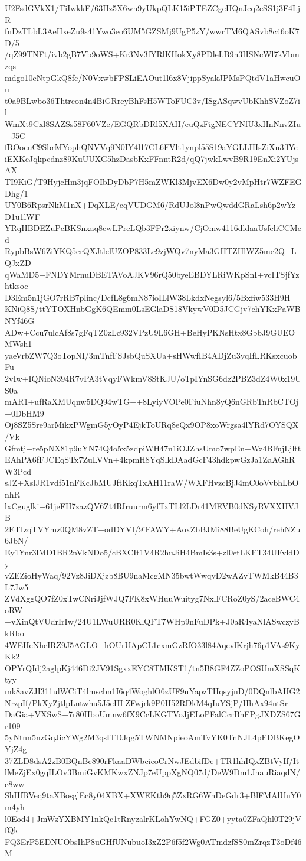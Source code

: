 U2FsdGVkX1/TiIwkkF/63Hz5X6wn9yUkpQLK15iPTEZCgcHQnJeq2eSS1j3F4LjR
fnDzTLbL3AeHxeZu9s41Ywo3eo6UM5GZSMj9UgP5zY/wwrTM6QASvb8c46oK7D/5
/qZ99TNFt/ivb2gB7Vb9oWS+Kr3Nv3fYRlKHokXy8PDleLB9n3HSNcWl7kVbmzqs
mdgo10eNtpGkQ8fc/N0VxwbFPSLiEAOut1l6x8VjippSyakJPMsPQtdV1aHwcuOu
t0a9BLwbo36Thtrcon4n4BiGRreyBhFsH5WToFUC3v/ISgASqwvUbKhhSVZoZ7il
WmXt9Cxl8SAZSs58F60VZe/EGQRbDRl5XAH/euQzFigNECYNfU3xHnNnvZIu+J5C
fROoeuC9SbrMYophQNVVq9N0IY4l17CL6FVlt1ynpl55S19aYGLLHIsZiXu3flYc
iEXKcJqkpcdnz89KuUUXG5hzDasbKxFFnntR2d/qQ7jwkLwvB9R19EnXi2YUjsAX
TI9KiG/T9HyjcHm3jqFOIbDyDbP7H5mZWKl3MjvEX6Dw0y2vMpHtr7WZFEGDhg/1
UY0B6RpsrNkM1nX+DqXLE/cqVUDGM6/RdUJol8nPwQwddGRaLsh6p2wYzD1u1lWF
YRqHBDEZuPcBKSnxaq8cwLPreLQb3FPr2xiynw/CjOmw4116dldaaUsfeliCCMed
RypbBsW6ZiYKQ5erQXJtlelUZOP833Lc9zjWQv7nyMa3GHTZHlWZ5me2Q+LQJxZD
qWaMD5+FNDYMrnuDBETAVoAJKV96rQ50byeEBDYLRiWKpSnI+vcITSjfYzhtksoc
D3Em5n1jGO7rRB7plinc/DcfL8g6mN87ioILlW38LkdxNegsyl6/5Bxfiw533H9H
KNiQ8S/ttYTOXHnbGgK6QEmm0LsEGlaDS18VkywV0D5JCGjv7ehYKxPaWBNYf46G
ADw+Ccu7ulcAf8s7gFqTZ0zLc932VPzU9L6GH+BeHyPKNsHtx8GbbJ9GUEOMWsh1
yaeVrbZW7Q3oTopNI/3mTnfFSJsbQuSXUa+sHWwfIB4ADjZu3yqIfLRKsxcuobFu
2vIw+IQNioN394R7vPA3tVqyFWkmV8StKJU/oTpIYnSG6dz2PBZ3dZ4W0x19US0a
mAR1+ufRaXMUqnw5DQ94wTG++8LyiyVOPe0FiuNhn8yQ6nGRbTnRbCTOj+0DbHM9
Oj8SZ5Sre9arMikxPWgmG5yOyP4EjkToURq8eQx9OP8xoWrgsa4lYRd7OYSQX/Vk
Gfmtj+re5pNX81p9uYN74Q4o5x5zdpiWH47n1iOJZhsUmo7wpEn+Wz4BFujLjltt
EAhPA6fFJCEqSTx7ZuLVVn+4kpmH8YqSlkDAadGcF43hdkpwGzJa1ZaAGhRW3Pcd
sJZ+XslJR1vdf51nFKcJbMUJftKkqTxAH11raW/WXFHvzcBjJ4mC0oVvbhLbOnhR
lxCguglki+61jeFH7zazQV6Zt4RIruurm6yfTxTLl2LDr41MEVB0dNSyRVXXHVJB
2ETIzqTVYmz0QM8vZT+odDYVI/9iFAWY+AoxZbBJMi88BeUgKCoh/rehNZu6JbN/
Ey1Ynr3lMD1BR2nVkNDo5/cBXCIt1V4R2huJiH4BmIs3s+zl0etLKFT34UFvldDy
vZEZioHyWaq/92Vz8JiDXjzb8BU9naMcgMN35bwtWwqyD2wAZvTWMkB44B3L7Jw5
ZVdXggQO7fZ0xTwCNriJjfWJQ7FK8xWHuuWuityg7NxlFCRoZ0yS/2aceBWC4oRW
+vXinQtVUdrIrIw/24U1LWuURR0KlQFT7WHp9nFuDPk+J0aR4yaNlASwczyBkRbo
4WEHeNheIRZ9J5AGLO+hOUrUApCL1cxmGzRfO33l84AqevlKrjh76p1VAs9KyKk2
OPYrQIdj2aglpKj446Di2JV91SgxxEYC8TMKST1/tn5B8GF4ZZoPOSUmXSSqKtyy
mk8avZJI311ulWCiT4lmscbn1I6q4WoghlO6zUF9uYapzTHqsyjnD/0DQnlbAHG2
NrzpIf/PkXyZjtlpLntwhu5J5eHIiZFwjrk9P0H52RDkM4qIuYSjP/HhAx94ntSr
DaGia+VXSwS+7r80HboUmnw6fX9CcLKGTVoJjELoPFalCcrBhFPgJXDZS67Gr109
5yNtnn5nzGqJicYWg2M3qsITDJqg5TWNMNpieoAmTvYK0TnNJL4pFDBKegOYjZ4g
37ZLD8dsA2zB0BQnBc890rFkaaDWbcieoCrNwJEdbifDe+TR1hhIQxZBtVyIf/It
lMeZjEx0gqILOv3BmiGvKMKwxZNJp7eUppXgNQ07d/DeW9Dm1JnauRiaqdN/c8ww
ShHfBVeq9taXBosglEc8y04XBX+XWEKth9q5ZxRG6WnDeGdr3+BlFMAlUuY0m4yh
l0Eod4+JmWzYXBMY1nkQc1tRnyzalrKLohYwNQ+FGZ0+yyta0ZFaQhl0T29jVfQk
FQ3ErP5EDNUObsIhP8uGHfUNubuoI3xZ2P6f5f2Wg0ATmdzfSS0mZrqzT3oDf46M
